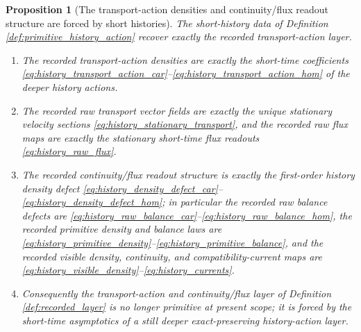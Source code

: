 \documentclass[11pt]{article}
\newtheorem{proposition}{Proposition}
\begin{document}
\begin{proposition}[The transport-action densities and continuity/flux readout structure are forced by short histories]
\label{prop:transport_from_histories}
The short-history data of Definition \ref{def:primitive_history_action} recover exactly the recorded transport-action layer.
\begin{enumerate}
    \item The recorded transport-action densities are exactly the short-time coefficients \eqref{eq:history_transport_action_car}--\eqref{eq:history_transport_action_hom} of the deeper history actions.
    \item The recorded raw transport vector fields are exactly the unique stationary velocity sections \eqref{eq:history_stationary_transport}, and the recorded raw flux maps are exactly the stationary short-time flux readouts \eqref{eq:history_raw_flux}.
    \item The recorded continuity/flux readout structure is exactly the first-order history density defect \eqref{eq:history_density_defect_car}--\eqref{eq:history_density_defect_hom}; in particular the recorded raw balance defects are \eqref{eq:history_raw_balance_car}--\eqref{eq:history_raw_balance_hom}, the recorded primitive density and balance laws are \eqref{eq:history_primitive_density}--\eqref{eq:history_primitive_balance}, and the recorded visible density, continuity, and compatibility-current maps are \eqref{eq:history_visible_density}--\eqref{eq:history_currents}.
    \item Consequently the transport-action and continuity/flux layer of Definition \ref{def:recorded_layer} is no longer primitive at present scope; it is forced by the short-time asymptotics of a still deeper exact-preserving history-action layer.
\end{enumerate}
\end{proposition}
\end{document}

